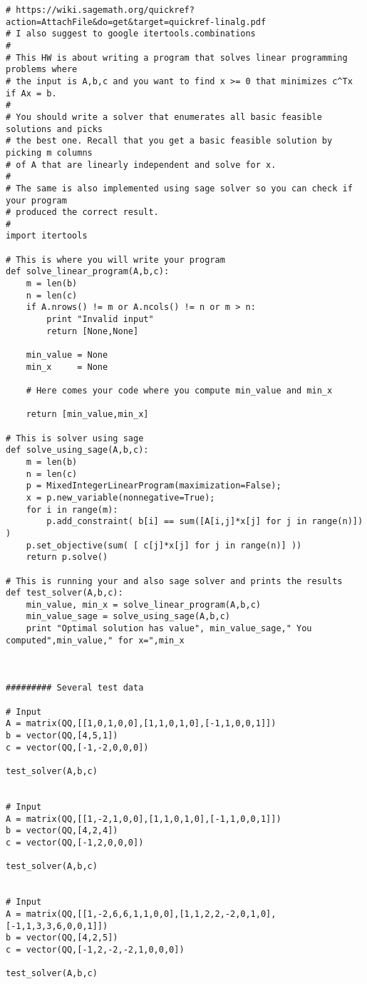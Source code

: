 \documentclass[11pt]{article}
\begin{document}
\begin{verbatim}
# https://wiki.sagemath.org/quickref?action=AttachFile&do=get&target=quickref-linalg.pdf
# I also suggest to google itertools.combinations
#
# This HW is about writing a program that solves linear programming problems where
# the input is A,b,c and you want to find x >= 0 that minimizes c^Tx if Ax = b.
#
# You should write a solver that enumerates all basic feasible solutions and picks
# the best one. Recall that you get a basic feasible solution by picking m columns
# of A that are linearly independent and solve for x.
#
# The same is also implemented using sage solver so you can check if your program
# produced the correct result.
#
import itertools

# This is where you will write your program
def solve_linear_program(A,b,c):
    m = len(b)
    n = len(c)
    if A.nrows() != m or A.ncols() != n or m > n:
        print "Invalid input"
        return [None,None]

    min_value = None
    min_x     = None
  
    # Here comes your code where you compute min_value and min_x
      
    return [min_value,min_x]

# This is solver using sage 
def solve_using_sage(A,b,c):
    m = len(b)
    n = len(c)
    p = MixedIntegerLinearProgram(maximization=False);
    x = p.new_variable(nonnegative=True);
    for i in range(m):
        p.add_constraint( b[i] == sum([A[i,j]*x[j] for j in range(n)]) )
    p.set_objective(sum( [ c[j]*x[j] for j in range(n)] ))
    return p.solve()
        
# This is running your and also sage solver and prints the results
def test_solver(A,b,c):
    min_value, min_x = solve_linear_program(A,b,c)
    min_value_sage = solve_using_sage(A,b,c)
    print "Optimal solution has value", min_value_sage," You computed",min_value," for x=",min_x
    


######### Several test data

# Input
A = matrix(QQ,[[1,0,1,0,0],[1,1,0,1,0],[-1,1,0,0,1]])
b = vector(QQ,[4,5,1])
c = vector(QQ,[-1,-2,0,0,0])

test_solver(A,b,c)


# Input
A = matrix(QQ,[[1,-2,1,0,0],[1,1,0,1,0],[-1,1,0,0,1]])
b = vector(QQ,[4,2,4])
c = vector(QQ,[-1,2,0,0,0])

test_solver(A,b,c)


# Input
A = matrix(QQ,[[1,-2,6,6,1,1,0,0],[1,1,2,2,-2,0,1,0],[-1,1,3,3,6,0,0,1]])
b = vector(QQ,[4,2,5])
c = vector(QQ,[-1,2,-2,-2,1,0,0,0])

test_solver(A,b,c)
\end{verbatim}
\end{document}
